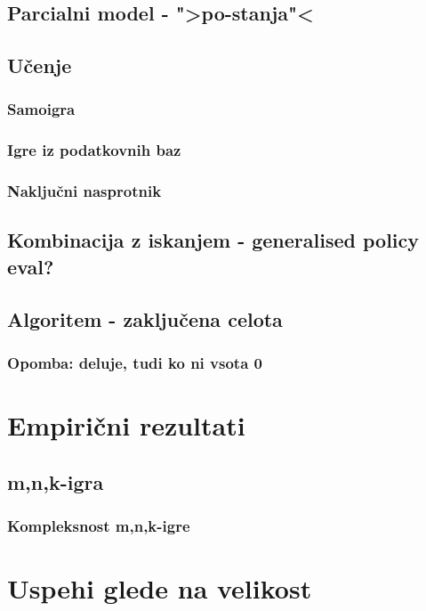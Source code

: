 \documentclass[12pt,a4paper]{amsart}
\theoremstyle{definition} %
\theoremstyle{plain} %
\begin{document}
\subsection{Parcialni model - ">po-stanja"<}

\subsection{Učenje}
\subsubsection{Samoigra}
\subsubsection{Igre iz podatkovnih baz}
\subsubsection{Naključni nasprotnik}

\subsection{Kombinacija z iskanjem - generalised policy eval?}

\subsection{Algoritem - zaključena celota}
\subsubsection{Opomba: deluje, tudi ko ni vsota 0}


\section{Empirični rezultati}

\subsection{m,n,k-igra}
\subsubsection{Kompleksnost m,n,k-igre}

\section{Uspehi glede na velikost}
\end{document}
